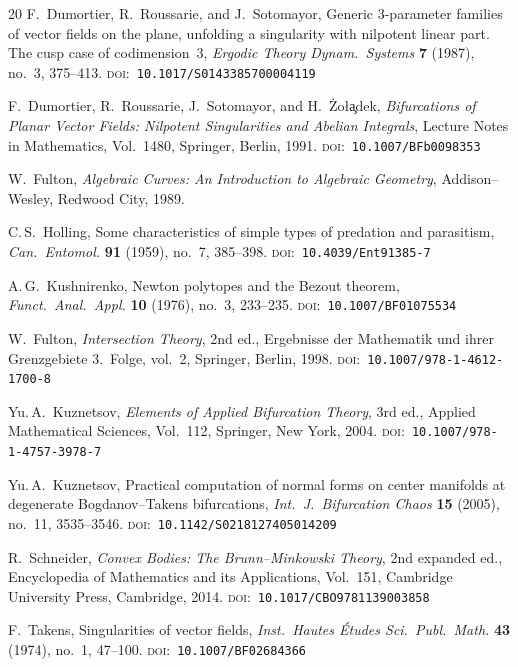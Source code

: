 \documentclass[12pt]{article}
\theoremstyle{plain}
\theoremstyle{definition}
\theoremstyle{remark}
\newcommand{\doi}[1]{\textsc{doi:}~\texttt{#1}}
\begin{document}
\begin{thebibliography}{20}
		F.~Dumortier, R.~Roussarie, and J.~Sotomayor,
		Generic 3-parameter families of vector fields on the plane, unfolding a
		singularity with nilpotent linear part.  The cusp case of codimension~3,
		\emph{Ergodic Theory Dynam.\ Systems} \textbf{7} (1987), no.~3,
		375--413.
		\newblock \doi{10.1017/S0143385700004119}
		
		F.~Dumortier, R.~Roussarie, J.~Sotomayor, and H.~\.Zo\l\c{a}dek,
		\emph{Bifurcations of Planar Vector Fields: Nilpotent Singularities and
			Abelian Integrals},
		Lecture Notes in Mathematics, Vol.~1480, Springer, Berlin, 1991.
		\newblock \doi{10.1007/BFb0098353}
		
		W.~Fulton,
		\emph{Algebraic Curves: An Introduction to Algebraic Geometry},
		Addison--Wesley, Redwood City, 1989.
		
		C.\,S.~Holling,
		Some characteristics of simple types of predation and parasitism,
		\emph{Can.\ Entomol.} \textbf{91} (1959), no.~7, 385--398.
		\newblock \doi{10.4039/Ent91385-7}
		
		A.\,G.~Kushnirenko,
		Newton polytopes and the Bezout theorem,
		\emph{Funct.\ Anal.\ Appl.} \textbf{10} (1976), no.~3, 233--235.
		\newblock \doi{10.1007/BF01075534}
		
		W.~Fulton,
		\emph{Intersection Theory}, 2nd ed.,
		Ergebnisse der Mathematik und ihrer Grenzgebiete 3.~Folge, vol.~2,
		Springer, Berlin, 1998.
		\newblock \doi{10.1007/978-1-4612-1700-8}
		
		Yu.\,A.~Kuznetsov,
		\emph{Elements of Applied Bifurcation Theory}, 3rd ed.,
		Applied Mathematical Sciences, Vol.~112, Springer, New York, 2004.
		\newblock \doi{10.1007/978-1-4757-3978-7}
		
		Yu.\,A.~Kuznetsov,
		Practical computation of normal forms on center manifolds at degenerate
		Bogdanov--Takens bifurcations,
		\emph{Int.\ J.\ Bifurcation Chaos} \textbf{15} (2005), no.~11,
		3535--3546.
		\newblock \doi{10.1142/S0218127405014209}
		
		R.~Schneider,
		\emph{Convex Bodies: The Brunn--Minkowski Theory}, 2nd expanded ed.,
		Encyclopedia of Mathematics and its Applications, Vol.~151,
		Cambridge University Press, Cambridge, 2014.
		\newblock \doi{10.1017/CBO9781139003858}
		
		F.~Takens,
		Singularities of vector fields,
		\emph{Inst.\ Hautes \'Etudes Sci.\ Publ.\ Math.} \textbf{43} (1974),
		no.~1, 47--100.
		\newblock \doi{10.1007/BF02684366}
		
	\end{thebibliography}
	
\end{document}
